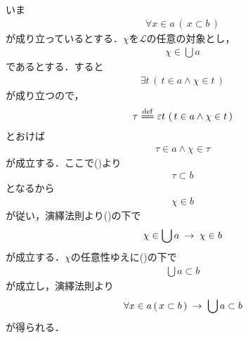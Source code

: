 	\begin{sketch}
		いま
		\begin{align}
			\forall x \in a\, (\, x \subset b\, )
			\label{fom:thm_union_of_subsets_is_subclass_1}
		\end{align}
		が成り立っているとする．$\chi$を$\mathcal{L}$の任意の対象とし，
		\begin{align}
			\chi \in \bigcup a
		\end{align}
		であるとする．すると
		\begin{align}
			\exists t\, \left(\, t \in a \wedge \chi \in t\, \right)
		\end{align}
		が成り立つので，
		\begin{align}
			\tau \defeq \varepsilon t\, \left(\, t \in a \wedge \chi \in t\, \right)
		\end{align}
		とおけば
		\begin{align}
			\tau \in a \wedge \chi \in \tau
		\end{align}
		が成立する．ここで()より
		\begin{align}
			\tau \subset b
		\end{align}
		となるから
		\begin{align}
			\chi \in b
		\end{align}
		が従い，演繹法則より()の下で
		\begin{align}
			\chi \in \bigcup a \hspace{0.25em}\rightarrow\hspace{0.25em} \chi \in b
		\end{align}
		が成立する．$\chi$の任意性ゆえに()の下で
		\begin{align}
			\bigcup a \subset b
		\end{align}
		が成立し，演繹法則より
		\begin{align}
			\forall x \in a\, (\, x \subset b\, ) \hspace{0.25em}\rightarrow\hspace{0.25em} \bigcup a \subset b
		\end{align}
		が得られる．
		\QED
	\end{sketch}